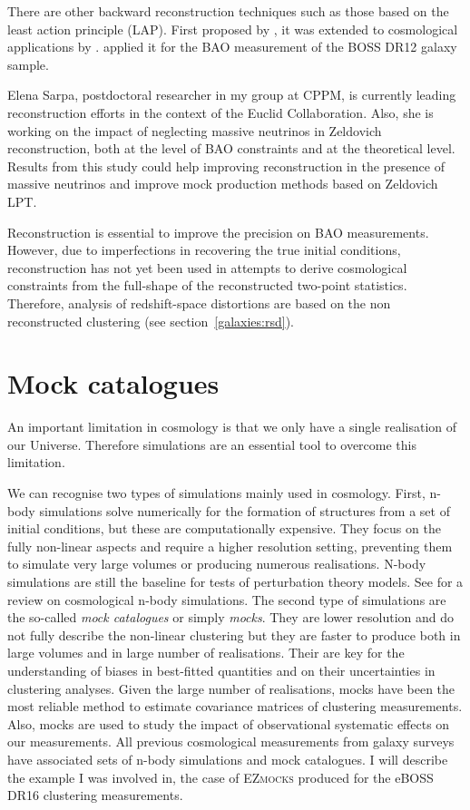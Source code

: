There are other backward reconstruction techniques such as those based on the least action principle (LAP).
First proposed by \cite{peeblesTracingGalaxyOrbits1989}, it was extended to cosmological applications 
by \cite{nusserLeastActionPrinciple2000, sarpaBAOReconstructionSwift2019}. 
\cite{sarpaExtendedFastAction2021} applied it for the BAO measurement of the BOSS DR12 galaxy sample. 

Elena Sarpa, postdoctoral researcher in my group at CPPM, is currently leading reconstruction efforts
in the context of the Euclid Collaboration. Also, she is working on the impact of neglecting massive 
neutrinos in Zeldovich reconstruction, both at the level of BAO constraints and at the theoretical 
level. Results from this study could help improving reconstruction in the presence of massive neutrinos 
and improve mock production methods based on Zeldovich LPT. 

Reconstruction is essential to improve the precision on BAO measurements. 
However, due to imperfections in recovering the true initial conditions, 
reconstruction has not yet been used in attempts to derive cosmological 
constraints from the full-shape of the reconstructed two-point statistics.
Therefore, analysis of redshift-space distortions are based on the non reconstructed 
clustering (see section~\ref{galaxies:rsd}).  

\section{Mock catalogues}
\label{galaxies:mocks}

An important limitation in cosmology is that we only have a single realisation of our Universe. 
Therefore simulations are an essential tool to overcome this limitation. 

We can recognise two types of simulations mainly used in cosmology. First, 
n-body simulations solve numerically for the formation of structures from a set of initial conditions, but these
are computationally expensive. They focus on the fully non-linear aspects and require a 
higher resolution setting, preventing them to simulate very large volumes or producing numerous 
realisations. N-body simulations are still the baseline for tests of perturbation theory models.
See \cite{anguloLargescaleDarkMatter2022} for a review on cosmological n-body simulations.  
The second type of simulations are the so-called \emph{mock catalogues} or simply \emph{mocks}. 
They are lower resolution and do not fully describe the non-linear clustering but they are 
faster to produce both in large volumes and in large number of realisations.
Their are key for the understanding of biases in best-fitted quantities and on their uncertainties 
in clustering analyses. 
Given the large number of realisations, mocks have been the most reliable method to estimate 
covariance matrices of clustering measurements. 
Also, mocks are used to study the impact of observational systematic effects on our 
measurements. 
All previous cosmological measurements from galaxy surveys have associated sets of 
n-body simulations and mock catalogues. I will describe the example I was involved in, 
the case of \textsc{EZmocks} produced for the eBOSS DR16 clustering measurements. 

